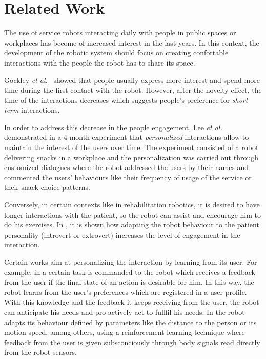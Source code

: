 \section{Related Work}

The use of service robots interacting daily with people in public
spaces or workplaces has become of increased interest in the last
years.
In this context, the development of the robotic system should focus on
creating confortable interactions with the people the robot has to
share its space.

Gockley \textit{et al.}~\cite{gockley2005} showed that people usually
express more interest and spend more time during the first contact
with the robot. However, after the novelty effect, the time of the
interactions decreases which suggests people's preference for
\textit{short-term} interactions.

In order to address this decrease in the people engagement, Lee
\textit{et al.}~\cite{Lee2012} demonstrated in a 4-month experiment
that \textit{personalized} interactions allow to maintain the interest of the
users over time.  The experiment consisted of a robot delivering
snacks in a workplace and the personalization was carried out through
customized dialogues where the robot addressed the users by their
names and commented the users' behaviours like their frequency of
usage of the service or their snack choice patterns.

Conversely, in certain contexts like in rehabilitation robotics, it is
desired to have longer interactions with the patient, so the robot can
assist and encourage him to do his exercises. In \cite{tapus2008}, it
is shown how adapting the robot behaviour to the patient personality
(introvert or extrovert) increases the level of engagement in the
interaction.

Certain works aim at personalizing the interaction by learning from its
user. For example, in \cite{mason2011robot} a certain task is
commanded to the robot which receives a feedback from the user if the
final state of an action is desirable for him.  In this way, the robot
learns from the user's preferences which are registered in a user
profile. With this knowledge and the feedback it keeps receiving from
the user, the robot can anticipate his needs and pro-actively act to
fullfil his needs.  In \cite{mitsunaga2008adapting} the robot adapts
its behaviour defined by parameters like the distance to the person or
its motion speed, among others, using a reinforcement learning technique
where feedback from the user is given subsconciously through body
signals read directly from the robot sensors.

